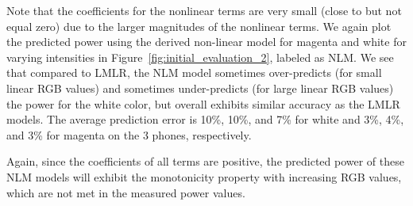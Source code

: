 Note that the coefficients for the nonlinear terms are very small (close to but not equal zero)
due to the larger magnitudes of the nonlinear terms.
We again plot the predicted power using the derived non-linear model
for magenta and white for varying intensities in
Figure~\ref{fig:initial_evaluation_2}, labeled as NLM.
We see that compared to LMLR, the NLM model 
sometimes over-predicts (for small linear RGB values)
and sometimes under-predicts (for large linear RGB values) the power for the
white color, but overall exhibits similar accuracy as the
LMLR models.
{The average prediction error is
10\%, 10\%, and 7\% for white
and 3\%, 4\%, and 3\% for magenta on the 3 phones, respectively.
}

{Again, since the coefficients of all terms are positive,}
the predicted power of these NLM models will exhibit the monotonicity property
with increasing RGB values, which are not met in the measured power values.
\fi

